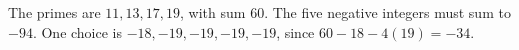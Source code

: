 The primes are $11,13,17,19$, with sum $60$. The five negative integers must sum to $-94$. One choice is $-18,-19,-19,-19,-19$, since $60-18-4(19)=-34$.
